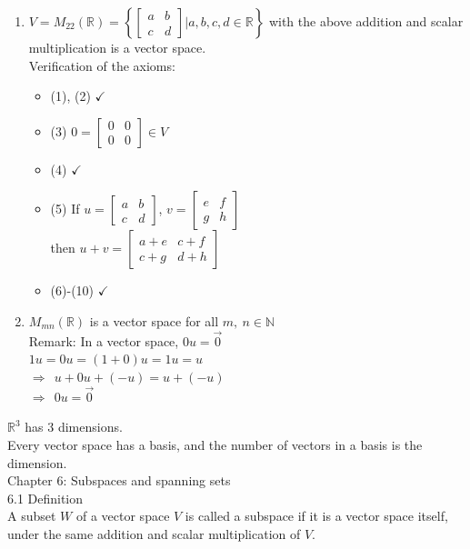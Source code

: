 \documentclass[]{article}
\begin{document}
		\begin{enumerate}
			\item $V=M_22(\mathbb{R})=\left\{
			\begin{bmatrix}
				{a}&{b}\\
				{c}&{d}
			\end{bmatrix}|
			a,b,c,d\in\mathbb{R}
			\right\}$
			with the above addition and scalar multiplication is a vector space.\\
			Verification of the axioms:
			\begin{itemize}
				\item (1), (2) $\checkmark$
				\item (3) $0=\begin{bmatrix}{0}&{0}\\{0}&{0}\end{bmatrix}\in V$
				\item (4) $\checkmark$\\
				\item (5) If $u=\begin{bmatrix}{a}&{b}\\{c}&{d}\end{bmatrix}$, $v=\begin{bmatrix}{e}&{f}\\{g}&{h}\end{bmatrix}$\\
				then $u+v=\begin{bmatrix}{a+e}&{c+f}\\{c+g}&{d+h}\end{bmatrix}$
				\item (6)-(10) $\checkmark$
			\end{itemize}
			\item $M_{mn}(\mathbb{R})$ is a vector space for all $m,~n\in\mathbb{N}$\\
			Remark: In a vector space, $0u=\vec{0}$\\
			$1u=0u=(1+0)u=1u=u$\\
			$\Rightarrow~~u+0u+(-u)=u+(-u)$\\
			$\Rightarrow~~0u=\vec{0}$
		\end{enumerate}
		$\mathbb{R}^3$ has 3 dimensions.\\
		Every vector space has a basis, and the number of vectors in a basis is the dimension.
		\pagebreak\\
		\Large{Chapter 6: Subspaces and spanning sets}\\
		\large{6.1 Definition}\\
		\normalsize A subset $W$ of a vector space $V$ is called a subspace if it is a vector space itself, under the same addition and scalar multiplication of $V$.\\
\end{document}
